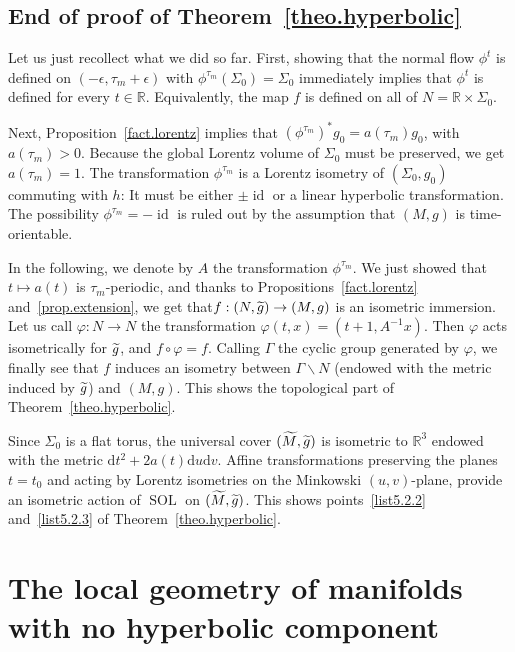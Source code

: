 \documentclass[11pt]{article}
\theoremstyle{definition}
\numberwithin{equation}{section}
\numberwithin{figure}{section}
\numberwithin{table}{section}
\DeclareMathOperator{\Sol}{SOL}
\DeclareMathOperator{\id}{id}
\newcommand*\RR{\mathbb{R}}
\let\oldtilde\tilde
\renewcommand*\tilde[1]{\mathchoice{\widetilde{#1}}{\widetilde{#1}}{\widetilde{#1}}{\oldtilde{#1}}}
\newcommand*{\dd}{\mathrm{d}}
\newcommand*{\dt}{\dd t}
\newcommand*{\du}{\dd u}
\newcommand*{\dv}{\dd v}
\begin{document}
\subsection{End of proof of Theorem~\ref{theo.hyperbolic}}\label{sec.conclusionhyperbolic}
Let us just recollect what we did so far. First, showing that the normal flow $\phi^t$ is defined on $(-\epsilon,\tau_m+\epsilon)$ with $\phi^{\tau_m}(\Sigma_0)=\Sigma_0$ immediately implies that $\phi^t$ is defined for every $t \in \RR$. Equivalently, the map $f$ is defined on all of $N=\RR \times \Sigma_0$.

Next, Proposition~\ref{fact.lorentz} implies that $(\phi^{\tau_m})^*g_0=a(\tau_m)g_0$, with $a(\tau_m)>0$. Because the global Lorentz volume of $\Sigma_0$ must be preserved, we get $a(\tau_m)=1$. The transformation $\phi^{\tau_m}$ is a Lorentz isometry of $(\Sigma_0,g_0)$ commuting with $h$: It must be either $\pm \id$ or a linear hyperbolic transformation. The possibility $\phi^{\tau_m}=- \id$ is ruled out by the assumption that $(M,g)$ is time-orientable.

In the following, we denote by $A$ the transformation $\phi^{\tau_m}$. We just showed that $t \mapsto a(t)$ is $\tau_m$-periodic, and thanks to Propositions~\ref{fact.lorentz} and~\ref{prop.extension}, we get that\linebreak $f: (N,\tilde{g}) \to (M,g)$ is an isometric immersion. Let us call $\varphi : N \to N$ the transformation $\varphi(t,x)=(t+1,A^{-1}x)$. Then $\varphi$ acts isometrically for $\tilde{g}$, and $f \circ \varphi = f$. Calling $\Gamma$ the cyclic group generated by $\varphi$, we finally see that $f$ induces an isometry between $\Gamma \backslash N$ (endowed with the metric induced by ${\tilde g}$) and $(M,g)$. This shows the topological part of Theorem~\ref{theo.hyperbolic}.

Since $\Sigma_0$ is a flat torus, the universal cover $(\tilde{M},\tilde{g})$ is isometric to $\RR^3$ endowed with the metric $\dt^2+2a(t)\du\dv$. Affine transformations preserving the planes $t=t_0$ and acting by Lorentz isometries on the Minkowski $(u,v)$-plane, provide an isometric action of $\Sol$ on $(\tilde{M},\tilde{g})$. This shows points~\eqref{list5.2.2} and~\eqref{list5.2.3} of Theorem~\ref{theo.hyperbolic}.



\section{The local geometry of manifolds with no hyperbolic component}\label{sec.local.geometry}
\end{document}
